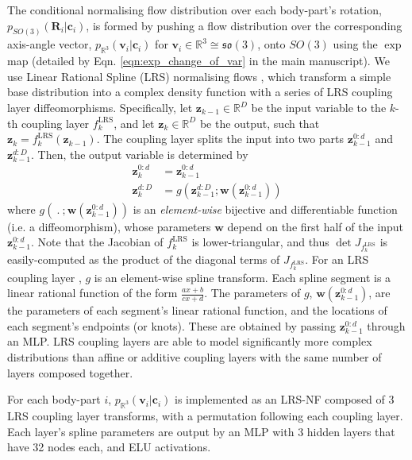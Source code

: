 The conditional normalising flow distribution over each body-part's rotation,  $p_{SO(3)}(\mathbf{R}_i | \mathbf{c}_i)$, is formed by pushing a flow distribution over the corresponding axis-angle vector, $p_{\mathbb{R}^3}(\mathbf{v}_i | \mathbf{c}_i)$ for $\mathbf{v}_i \in \mathbb{R}^3 \cong \mathfrak{so}(3)$, onto $SO(3)$ using the $\exp$ map (detailed by Eqn. \ref{eqn:exp_change_of_var} in the main manuscript). We use Linear Rational Spline (LRS) normalising flows \cite{dolatabadi2020lrs}, which transform a simple base distribution into a complex density function with a series of LRS coupling layer diffeomorphisms.  Specifically, let $\mathbf{z}_{k-1} \in \mathbb{R}^D$ be the input variable to the $k$-th coupling layer $f^\text{LRS}_k$, and let $\mathbf{z}_k \in \mathbb{R}^D$ be the output, such that $\mathbf{z}_k = f^\text{LRS}_k(\mathbf{z}_{k-1})$. The coupling layer \cite{dinh2015nice, dinh2017realnvp} splits the input into two parts $\mathbf{z}_{k-1}^{0:d}$ and $\mathbf{z}_{k-1}^{d:D}$. Then, the output variable is determined by
\begin{equation}
\begin{aligned}
    \mathbf{z}_k^{0:d} &= \mathbf{z}_{k-1}^{0:d}\\
    \mathbf{z}_k^{d:D} &= g(\mathbf{z}_{k-1}^{d:D}; \mathbf{w}(\mathbf{z}_{k-1}^{0:d}))
\end{aligned}
\end{equation}
where $g(\:.\:; \mathbf{w}(\mathbf{z}_{k-1}^{0:d}))$ is an \textit{element-wise} bijective and differentiable function (i.e. a diffeomorphism), whose parameters $\mathbf{w}$ depend on the first half of the input $\mathbf{z}_{k-1}^{0:d}$. Note that the Jacobian of $f^\text{LRS}_k$ is lower-triangular, and thus $\det J_{f^\text{LRS}_k}$ is easily-computed as the product of the diagonal terms of $J_{f^\text{LRS}_k}$. For an LRS coupling layer \cite{dolatabadi2020lrs}, $g$ is an element-wise spline transform. Each spline segment is a linear rational function of the form $\frac{ax+b}{cx+d}$. The parameters of $g$, $\mathbf{w}(\mathbf{z}_{k-1}^{0:d})$, are the parameters of each segment's linear rational function, and the locations of each segment's endpoints (or knots). These are obtained by passing $\mathbf{z}_{k-1}^{0:d}$ through an MLP. LRS coupling layers are able to model significantly more complex distributions \cite{dolatabadi2020lrs} than affine \cite{dinh2017realnvp} or additive \cite{dinh2015nice} coupling layers with the same number of layers composed together.

For each body-part $i$,  $p_{\mathbb{R}^3}(\mathbf{v}_i | \mathbf{c}_i)$ is implemented as an LRS-NF composed of 3 LRS coupling layer transforms, with a permutation following each coupling layer. Each layer's spline parameters are output by an MLP with 3 hidden layers that have 32 nodes each, and ELU \cite{clevert2016elu} activations.

